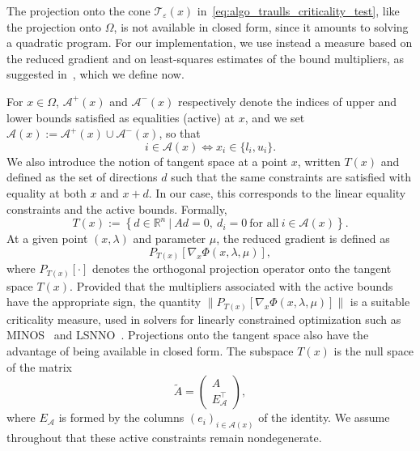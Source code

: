 \documentclass[pdflatex,sn-mathphys-num]{sn-jnl}%
\theoremstyle{thmstyleone}%
\newcommand{\RR}{{\mathbb{R}}} %
\newcommand{\calA}{{\mathcal{A}}}
\newcommand{\calT}{{\mathcal{T}}}
\newcommand{\proj}[2]{P_{#1} \left[ {#2} \right]} %
\begin{document}
The projection onto the cone $\calT_\varepsilon(x)$ in~\eqref{eq:algo_traulls_criticality_test}, like the projection onto $\Omega$, is not available in closed form, since it amounts to solving a quadratic program. For our implementation, we use instead a measure based on the reduced gradient and on least-squares estimates of the bound multipliers, as suggested in~\cite[Section~7.2]{conn-etal:1996b}, which we define now.

For $x \in \Omega$, $\calA^+(x)$ and $\calA^-(x)$ respectively denote the indices of upper and lower bounds satisfied as equalities (active) at $x$, and we set $\calA(x) := \calA^+(x) \cup \calA^-(x)$, so that
\begin{equation*}
	i \in \calA(x) \iff x_i \in \{l_i,u_i\}.
\end{equation*}
We also introduce the notion of tangent space at a point $x$, written $T(x)$ and defined as the set of directions $d$ such that the same constraints are satisfied with equality at both $x$ and $x+d$. In our case, this corresponds to the linear equality constraints and the active bounds. Formally,
\begin{equation}\label{eq:tangent_space}
	T(x) := \left\{ d \in \RR^n \ | \ Ad = 0,\ d_i=0\ \text{for all}\ i\in \calA(x)\right\}.
\end{equation}
At a given point \((x,\lambda)\) and parameter $\mu$, the reduced gradient is defined as
\begin{equation*}
	\proj{T(x)}{\nabla_x \Phi(x,\lambda,\mu)},
\end{equation*}
where $\proj{T(x)}{\cdot}$ denotes the orthogonal projection operator onto the tangent space $T(x)$.
Provided that the multipliers associated with the active bounds have the appropriate sign, the quantity $\|\proj{T(x)}{\nabla_x \Phi(x,\lambda,\mu)}\|$ is a suitable criticality measure, used in solvers for linearly constrained optimization such as MINOS~\cite{murtaghsaunders:1978} and LSNNO~\cite{tointtuyttens:1992}.
Projections onto the tangent space also have the advantage of being available in closed form. The subspace $T(x)$ is the null space of the matrix
\begin{equation}\label{eq:matrix_tangent_space}
	\tilde{A} = \begin{pmatrix}
		A \\ E_\calA^\top
	\end{pmatrix},
\end{equation}
where $E_\calA$ is formed by the columns $(e_i)_{i \in \calA(x)}$ of the identity. We assume throughout that these active constraints remain nondegenerate.
\end{document}
